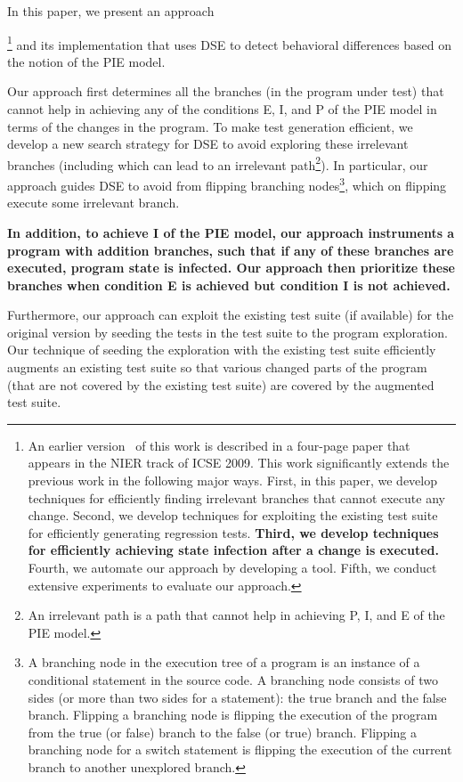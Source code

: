 In this paper, we present an approach{\footnote{\scriptsize{An earlier version~\cite{taneja09:guided} of this work is described in a four-page paper that appears in the NIER track of ICSE 2009. This
work significantly extends the previous work in the following major ways.
First, in this paper, we develop techniques for efficiently finding irrelevant branches 
that cannot execute any change. 
Second, we develop techniques for exploiting the existing test suite for efficiently generating regression tests.
\textbf{Third, we develop techniques for efficiently achieving state infection after a change is executed.}
Fourth, we automate our approach by developing a tool.
Fifth, we conduct extensive experiments to evaluate our approach.}}  and its implementation that uses DSE to detect behavioral differences based on the notion of the PIE model.

Our approach first determines all the branches (in the program under test) that cannot help in achieving any of the conditions E, I, and P of the PIE model in terms of the changes in the program. To make test generation efficient, we develop a new search strategy for DSE to avoid exploring these irrelevant branches (including which can lead to an irrelevant path\footnote{\scriptsize{An irrelevant path is a path that cannot help in achieving P, I, and E of the PIE model.}}). In particular, our approach guides DSE to avoid from flipping branching nodes\footnote{\scriptsize{A branching node in the execution tree of a program is an instance of a conditional statement in the source code. A branching node consists of two sides (or more than two sides for a  statement): the true branch and the false branch. Flipping a branching node is flipping the execution of the program from the true (or false) branch to the false (or true) branch. Flipping a branching node for a switch statement is flipping the execution of the current branch to another unexplored branch.}}, which on flipping execute some irrelevant branch. 

\textbf{
In addition, to achieve I of the PIE model, our approach instruments a program with addition branches, 
such that if any of these branches are executed, program state is infected. 
Our approach then prioritize these branches when condition E is achieved 
but condition I is not achieved.
}

Furthermore, our approach can exploit the existing test suite (if available) for the original version by seeding the tests in the test suite to the program exploration. Our technique of seeding the exploration with the existing test suite efficiently augments an existing test suite so that various changed parts of the program (that are not covered by the existing test suite) are covered by the augmented test suite. 

}
